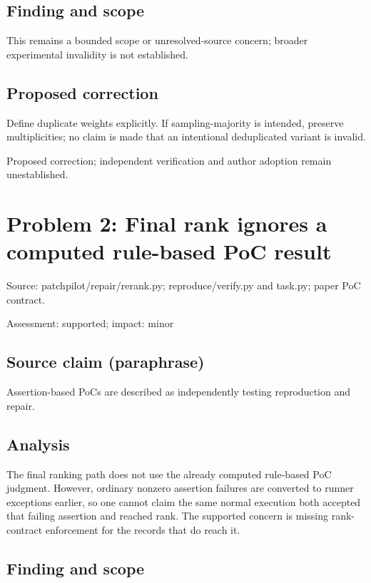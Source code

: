 \documentclass[11pt]{article}
\begin{document}
\subsection*{Finding and scope}

This remains a bounded scope or unresolved-source concern; broader experimental invalidity is not established.

\subsection*{Proposed correction}

Define duplicate weights explicitly. If sampling-majority is intended, preserve multiplicities; no claim is made that an intentional deduplicated variant is invalid.

Proposed correction; independent verification and author adoption remain unestablished.

\section*{Problem 2: Final rank ignores a computed rule-based PoC result}

Source: patchpilot/repair/rerank.py; reproduce/verify.py and task.py; paper PoC contract.

Assessment: supported; impact: minor

\subsection*{Source claim (paraphrase)}

Assertion-based PoCs are described as independently testing reproduction and repair.

\subsection*{Analysis}

The final ranking path does not use the already computed rule-based PoC judgment. However, ordinary nonzero assertion failures are converted to runner exceptions earlier, so one cannot claim the same normal execution both accepted that failing assertion and reached rank. The supported concern is missing rank-contract enforcement for the records that do reach it.

\subsection*{Finding and scope}
\end{document}
